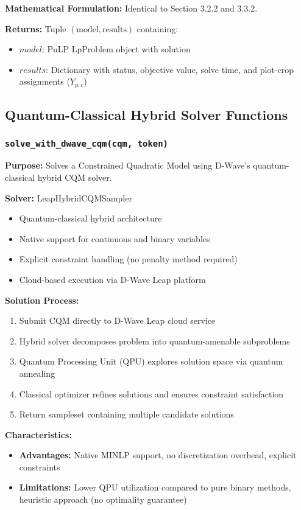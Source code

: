 \documentclass{article}
\begin{document}
\textbf{Mathematical Formulation:} Identical to Section 3.2.2 and 3.3.2.

\textbf{Returns:} Tuple $(\text{model}, \text{results})$ containing:
\begin{itemize}
    \item $model$: PuLP LpProblem object with solution
    \item $results$: Dictionary with status, objective value, solve time, and plot-crop assignments ($Y_{p,c}$)
\end{itemize}

\subsection{Quantum-Classical Hybrid Solver Functions}

\subsubsection{\texttt{solve\_with\_dwave\_cqm(cqm, token)}}

\textbf{Purpose:} Solves a Constrained Quadratic Model using D-Wave's quantum-classical hybrid CQM solver.

\textbf{Solver:} LeapHybridCQMSampler
\begin{itemize}
    \item Quantum-classical hybrid architecture
    \item Native support for continuous and binary variables
    \item Explicit constraint handling (no penalty method required)
    \item Cloud-based execution via D-Wave Leap platform
\end{itemize}

\textbf{Solution Process:}
\begin{enumerate}
    \item Submit CQM directly to D-Wave Leap cloud service
    \item Hybrid solver decomposes problem into quantum-amenable subproblems
    \item Quantum Processing Unit (QPU) explores solution space via quantum annealing
    \item Classical optimizer refines solutions and ensures constraint satisfaction
    \item Return sampleset containing multiple candidate solutions
\end{enumerate}

\textbf{Characteristics:}
\begin{itemize}
    \item \textbf{Advantages:} Native MINLP support, no discretization overhead, explicit constraints
    \item \textbf{Limitations:} Lower QPU utilization compared to pure binary methods, heuristic approach (no optimality guarantee)
\end{itemize}
\end{document}
